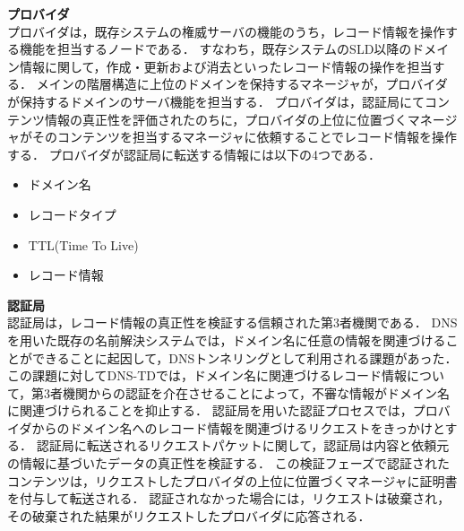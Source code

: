 \hspace{-12pt}\textbf{プロバイダ}\\
\hspace{12pt}プロバイダは，既存システムの権威サーバの機能のうち，レコード情報を操作する機能を担当するノードである．
すなわち，既存システムのSLD以降のドメイン情報に関して，作成・更新および消去といったレコード情報の操作を担当する．
メインの階層構造に上位のドメインを保持するマネージャが，プロバイダが保持するドメインのサーバ機能を担当する．
プロバイダは，認証局にてコンテンツ情報の真正性を評価されたのちに，プロバイダの上位に位置づくマネージャがそのコンテンツを担当するマネージャに依頼することでレコード情報を操作する．
プロバイダが認証局に転送する情報には以下の4つである．
\begin{itemize}
 \item ドメイン名
 \vspace{-3mm}
 \item レコードタイプ
 \vspace{-3mm}
 \item TTL(Time To Live)
 \vspace{-3mm}
 \item レコード情報
\end{itemize}

\hspace{-12pt}\textbf{認証局}\\
\hspace{12pt}認証局は，レコード情報の真正性を検証する信頼された第3者機関である．
DNSを用いた既存の名前解決システムでは，ドメイン名に任意の情報を関連づけることができることに起因して，DNSトンネリングとして利用される課題があった．
この課題に対してDNS-TDでは，ドメイン名に関連づけるレコード情報について，第3者機関からの認証を介在させることによって，不審な情報がドメイン名に関連づけられることを抑止する．
認証局を用いた認証プロセスでは，プロバイダからのドメイン名へのレコード情報を関連づけるリクエストをきっかけとする．
認証局に転送されるリクエストパケットに関して，認証局は内容と依頼元の情報に基づいたデータの真正性を検証する．
この検証フェーズで認証されたコンテンツは，リクエストしたプロバイダの上位に位置づくマネージャに証明書を付与して転送される．
認証されなかった場合には，リクエストは破棄され，その破棄された結果がリクエストしたプロバイダに応答される．

